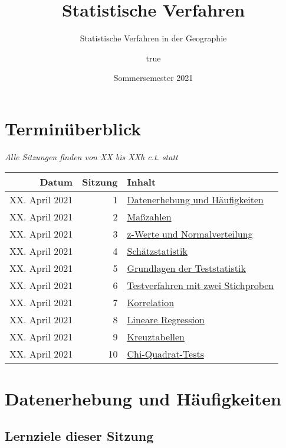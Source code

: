 \documentclass[
  ngerman,
]{article}
\title{Statistische Verfahren}
\subtitle{Statistische Verfahren in der Geographie}
\author{true}
\date{Sommersemester 2021}
\begin{document}
\maketitle

{
\setcounter{tocdepth}{2}
\tableofcontents
}
\hypertarget{terminuxfcberblick}{%
\section*{Terminüberblick}\label{terminuxfcberblick}}

\emph{Alle Sitzungen finden von XX bis XXh c.t. statt}

\begin{longtable}[]{@{}rrl@{}}
\toprule
Datum & Sitzung & Inhalt\tabularnewline
\midrule
\endhead
XX. April 2021 & 1 & \protect\hyperlink{Datenerhebungux5cux2520undux5cux2520Huxe4ufigkeiten}{Datenerhebung und Häufigkeiten}\tabularnewline
XX. April 2021 & 2 & \protect\hyperlink{Mauxdfzahlen}{Maßzahlen}\tabularnewline
XX. April 2021 & 3 & \protect\hyperlink{z-Werteux5cux2520undux5cux2520Normalverteilung}{z-Werte und Normalverteilung}\tabularnewline
XX. April 2021 & 4 & \href{Schätzstatistik4}{Schätzstatistik}\tabularnewline
XX. April 2021 & 5 & \protect\hyperlink{Grundlagenux5cux2520derux5cux2520Teststatistik}{Grundlagen der Teststatistik}\tabularnewline
XX. April 2021 & 6 & \protect\hyperlink{Testverfahrenux5cux2520mitux5cux2520zweiux5cux2520Stichproben}{Testverfahren mit zwei Stichproben}\tabularnewline
XX. April 2021 & 7 & \protect\hyperlink{Korrelation}{Korrelation}\tabularnewline
XX. April 2021 & 8 & \protect\hyperlink{Lineareux5cux2520Regression}{Lineare Regression}\tabularnewline
XX. April 2021 & 9 & \protect\hyperlink{Kreuztabellen}{Kreuztabellen}\tabularnewline
XX. April 2021 & 10 & \protect\hyperlink{Chi-Quadrat-Tests}{Chi-Quadrat-Tests}\tabularnewline
\bottomrule
\end{longtable}

\hypertarget{datenerhebung-und-huxe4ufigkeiten}{%
\section{Datenerhebung und Häufigkeiten}\label{datenerhebung-und-huxe4ufigkeiten}}

\hypertarget{lernziele-dieser-sitzung}{%
\subsection{Lernziele dieser Sitzung}\label{lernziele-dieser-sitzung}}
\end{document}
